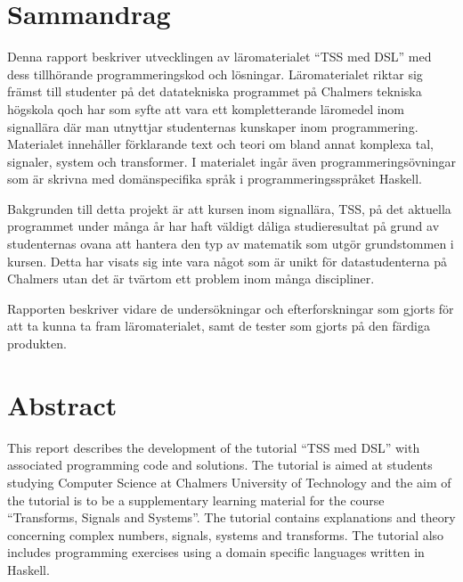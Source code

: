 \documentclass[]{article}
\begin{document}
\section*{Sammandrag}
Denna rapport beskriver utvecklingen av läromaterialet ``TSS med DSL'' med dess
tillhörande programmeringskod och lösningar. Läromaterialet riktar sig främst
till studenter på det datatekniska programmet på Chalmers tekniska högskola qoch har som syfte att
vara ett kompletterande läromedel inom signallära där man utnyttjar studenternas
kunskaper inom programmering. Materialet innehåller förklarande text och teori
om bland annat komplexa tal, signaler, system och transformer. I materialet
ingår även programmeringsövningar som är skrivna med domänspecifika språk i
programmeringsspråket \gls{Haskell}.

Bakgrunden till detta projekt är att kursen inom signallära, TSS, på det
aktuella programmet under många år har haft väldigt dåliga studieresultat på
grund av studenternas ovana att hantera den typ av matematik som utgör
grundstommen i kursen. Detta har visats sig inte vara något som är unikt
för datastudenterna på Chalmers utan det är tvärtom ett problem inom många
discipliner.

Rapporten beskriver vidare de undersökningar och efterforskningar som gjorts
för att ta kunna ta fram läromaterialet, samt de tester som gjorts på den
färdiga produkten.

\newpage
\section*{Abstract}
This report describes the development of the tutorial ``TSS med DSL'' with
associated programming code and solutions. The tutorial is aimed at students
studying Computer Science at Chalmers University of Technology and the aim of
the tutorial is to be a supplementary learning material for the course
``Transforms, Signals and Systems''. The tutorial contains explanations and
theory concerning complex numbers, signals, systems and transforms. The
tutorial also includes programming exercises using a domain specific languages
written in Haskell.
\end{document}

